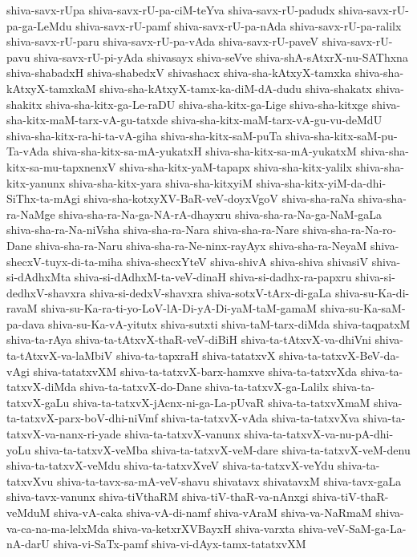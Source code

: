 {shiva-savx-rUpa
shiva-savx-rU-pa-ciM-teYva
shiva-savx-rU-padudx
shiva-savx-rU-pa-ga-LeMdu
shiva-savx-rU-pamf
shiva-savx-rU-pa-nAda
shiva-savx-rU-pa-ralilx
shiva-savx-rU-paru
shiva-savx-rU-pa-vAda
shiva-savx-rU-paveV
shiva-savx-rU-pavu
shiva-savx-rU-pi-yAda
shivasayx
shiva-seVve
shiva-shA-sAtxrX-nu-SAThxna
shiva-shabadxH
shiva-shabedxV
shivashacx
shiva-sha-kAtxyX-tamxka
shiva-sha-kAtxyX-tamxkaM
shiva-sha-kAtxyX-tamx-ka-diM-dA-dudu
shiva-shakatx
shiva-shakitx
shiva-sha-kitx-ga-Le-raDU
shiva-sha-kitx-ga-Lige
shiva-sha-kitxge
shiva-sha-kitx-maM-tarx-vA-gu-tatxde
shiva-sha-kitx-maM-tarx-vA-gu-vu-deMdU
shiva-sha-kitx-ra-hi-ta-vA-giha
shiva-sha-kitx-saM-puTa
shiva-sha-kitx-saM-pu-Ta-vAda
shiva-sha-kitx-sa-mA-yukatxH
shiva-sha-kitx-sa-mA-yukatxM
shiva-sha-kitx-sa-mu-tapxnenxV
shiva-sha-kitx-yaM-tapapx
shiva-sha-kitx-yalilx
shiva-sha-kitx-yanunx
shiva-sha-kitx-yara
shiva-sha-kitxyiM
shiva-sha-kitx-yiM-da-dhi-SiThx-ta-mAgi
shiva-sha-kotxyXV-BaR-veV-doyxVgoV
shiva-sha-raNa
shiva-sha-ra-NaMge
shiva-sha-ra-Na-ga-NA-rA-dhayxru
shiva-sha-ra-Na-ga-NaM-gaLa
shiva-sha-ra-Na-niVsha
shiva-sha-ra-Nara
shiva-sha-ra-Nare
shiva-sha-ra-Na-ro-Dane
shiva-sha-ra-Naru
shiva-sha-ra-Ne-ninx-rayAyx
shiva-sha-ra-NeyaM
shiva-shecxV-tuyx-di-ta-miha
shiva-shecxYteV
shiva-shivA
shiva-shiva
shivasiV
shiva-si-dAdhxMta
shiva-si-dAdhxM-ta-veV-dinaH
shiva-si-dadhx-ra-papxru
shiva-si-dedhxV-shavxra
shiva-si-dedxV-shavxra
shiva-sotxV-tArx-di-gaLa
shiva-su-Ka-di-ravaM
shiva-su-Ka-ra-ti-yo-LoV-lA-Di-yA-Di-yaM-taM-gamaM
shiva-su-Ka-saM-pa-dava
shiva-su-Ka-vA-yitutx
shiva-sutxti
shiva-taM-tarx-diMda
shiva-taqpatxM
shiva-ta-rAya
shiva-ta-tAtxvX-thaR-veV-diBiH
shiva-ta-tAtxvX-va-dhiVni
shiva-ta-tAtxvX-va-laMbiV
shiva-ta-tapxraH
shiva-tatatxvX
shiva-ta-tatxvX-BeV-da-vAgi
shiva-tatatxvXM
shiva-ta-tatxvX-barx-hamxve
shiva-ta-tatxvXda
shiva-ta-tatxvX-diMda
shiva-ta-tatxvX-do-Dane
shiva-ta-tatxvX-ga-Lalilx
shiva-ta-tatxvX-gaLu
shiva-ta-tatxvX-jAcnx-ni-ga-La-pUvaR
shiva-ta-tatxvXmaM
shiva-ta-tatxvX-parx-boV-dhi-niVmf
shiva-ta-tatxvX-vAda
shiva-ta-tatxvXva
shiva-ta-tatxvX-va-nanx-ri-yade
shiva-ta-tatxvX-vanunx
shiva-ta-tatxvX-va-nu-pA-dhi-yoLu
shiva-ta-tatxvX-veMba
shiva-ta-tatxvX-veM-dare
shiva-ta-tatxvX-veM-denu
shiva-ta-tatxvX-veMdu
shiva-ta-tatxvXveV
shiva-ta-tatxvX-veYdu
shiva-ta-tatxvXvu
shiva-ta-tavx-sa-mA-veV-shavu
shivatavx
shivatavxM
shiva-tavx-gaLa
shiva-tavx-vanunx
shiva-tiVthaRM
shiva-tiV-thaR-va-nAnxgi
shiva-tiV-thaR-veMduM
shiva-vA-caka
shiva-vA-di-namf
shiva-vAraM
shiva-va-NaRmaM
shiva-va-ca-na-ma-lelxMda
shiva-va-ketxrXVBayxH
shiva-varxta
shiva-veV-SaM-ga-La-nA-darU
shiva-vi-SaTx-pamf
shiva-vi-dAyx-tamx-tatatxvXM
}

